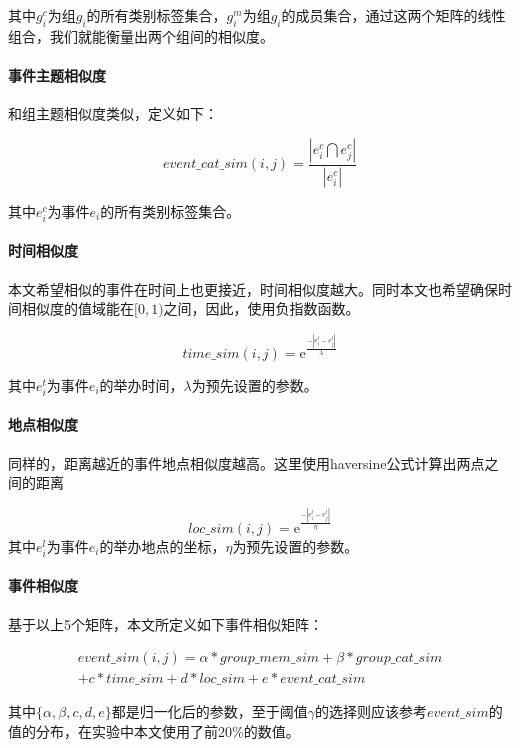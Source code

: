 其中$g_i^c$为组$g_i$的所有类别标签集合，$g_i^m$为组$g_i$的成员集合，通过这两个矩阵的线性组合，我们就能衡量出两个组间的相似度。

\paragraph{事件主题相似度}

和组主题相似度类似，定义如下：

\begin{equation}
event\_cat\_sim(i,j)=\frac{|e_i^c\bigcap e_j^c|}{|e_i^c|}
\end{equation}

其中$e_i^c$为事件$e_i$的所有类别标签集合。
\paragraph{时间相似度}

本文希望相似的事件在时间上也更接近，时间相似度越大。同时本文也希望确保时间相似度的值域能在\([0,1)\)之间，因此，使用负指数函数。

\begin{equation}   
time\_sim(i,j)=\mathrm{e}^\frac{-|e_i^t-e_j^t|}{\lambda}
\end{equation}

其中$e_i^t$为事件$e_i$的举办时间，\(\lambda\)为预先设置的参数。

\paragraph{地点相似度}

同样的，距离越近的事件地点相似度越高。这里使用haversine公式计算出两点之间的距离

\begin{equation}   
loc\_sim(i,j)=\mathrm{e}^\frac{-|e_i^l-e_j^l|}{\eta}
\end{equation}
其中$e_i^l$为事件$e_i$的举办地点的坐标，$\eta$为预先设置的参数。
\paragraph{事件相似度}
基于以上5个矩阵，本文所定义如下事件相似矩阵：

\begin{multline}   
event\_sim(i,j)=\alpha*group\_mem\_sim+\beta*group\_cat\_sim
\\+{c}*time\_sim+{d}*loc\_sim+{e}*event\_cat\_sim
\end{multline}

其中\(\{\alpha,\beta,{c},{d},{e}\}\)都是归一化后的参数，至于阈值\(\gamma\)的选择则应该参考\(event\_sim\)的值的分布，在实验中本文使用了前20\%的数值。


